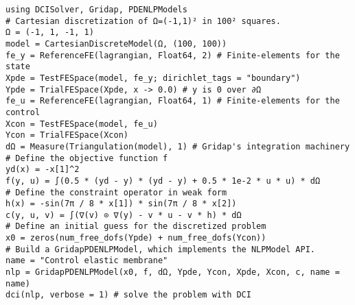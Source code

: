 \documentclass[11pt]{minimal}
\begin{document}
\begin{verbatim}
using DCISolver, Gridap, PDENLPModels
# Cartesian discretization of Ω=(-1,1)² in 100² squares.
Ω = (-1, 1, -1, 1)
model = CartesianDiscreteModel(Ω, (100, 100))
fe_y = ReferenceFE(lagrangian, Float64, 2) # Finite-elements for the state
Xpde = TestFESpace(model, fe_y; dirichlet_tags = "boundary")
Ypde = TrialFESpace(Xpde, x -> 0.0) # y is 0 over ∂Ω
fe_u = ReferenceFE(lagrangian, Float64, 1) # Finite-elements for the control
Xcon = TestFESpace(model, fe_u)
Ycon = TrialFESpace(Xcon)
dΩ = Measure(Triangulation(model), 1) # Gridap's integration machinery
# Define the objective function f
yd(x) = -x[1]^2
f(y, u) = ∫(0.5 * (yd - y) * (yd - y) + 0.5 * 1e-2 * u * u) * dΩ
# Define the constraint operator in weak form
h(x) = -sin(7π / 8 * x[1]) * sin(7π / 8 * x[2])
c(y, u, v) = ∫(∇(v) ⊙ ∇(y) - v * u - v * h) * dΩ
# Define an initial guess for the discretized problem
x0 = zeros(num_free_dofs(Ypde) + num_free_dofs(Ycon))
# Build a GridapPDENLPModel, which implements the NLPModel API.
name = "Control elastic membrane"
nlp = GridapPDENLPModel(x0, f, dΩ, Ypde, Ycon, Xpde, Xcon, c, name = name)
dci(nlp, verbose = 1) # solve the problem with DCI
\end{verbatim}
\end{document}
